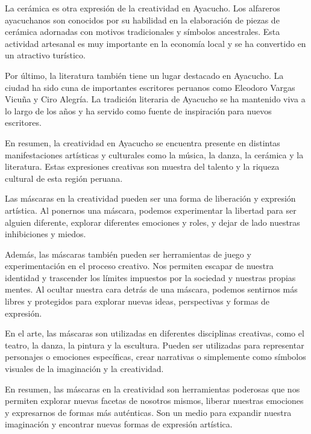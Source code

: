 \documentclass[12pt,a4paper]{article}
\begin{document}
La cerámica es otra expresión de la creatividad en Ayacucho. Los alfareros ayacuchanos son conocidos por su habilidad en la elaboración de piezas de cerámica adornadas con motivos tradicionales y símbolos ancestrales. Esta actividad artesanal es muy importante en la economía local y se ha convertido en un atractivo turístico.

Por último, la literatura también tiene un lugar destacado en Ayacucho. La ciudad ha sido cuna de importantes escritores peruanos como Eleodoro Vargas Vicuña y Ciro Alegría. La tradición literaria de Ayacucho se ha mantenido viva a lo largo de los años y ha servido como fuente de inspiración para nuevos escritores.

En resumen, la creatividad en Ayacucho se encuentra presente en distintas manifestaciones artísticas y culturales como la música, la danza, la cerámica y la literatura. Estas expresiones creativas son muestra del talento y la riqueza cultural de esta región peruana.

Las máscaras en la creatividad pueden ser una forma de liberación y expresión artística. Al ponernos una máscara, podemos experimentar la libertad para ser alguien diferente, explorar diferentes emociones y roles, y dejar de lado nuestras inhibiciones y miedos.

Además, las máscaras también pueden ser herramientas de juego y experimentación en el proceso creativo. Nos permiten escapar de nuestra identidad y trascender los límites impuestos por la sociedad y nuestras propias mentes. Al ocultar nuestra cara detrás de una máscara, podemos sentirnos más libres y protegidos para explorar nuevas ideas, perspectivas y formas de expresión.

En el arte, las máscaras son utilizadas en diferentes disciplinas creativas, como el teatro, la danza, la pintura y la escultura. Pueden ser utilizadas para representar personajes o emociones específicas, crear narrativas o simplemente como símbolos visuales de la imaginación y la creatividad.

En resumen, las máscaras en la creatividad son herramientas poderosas que nos permiten explorar nuevas facetas de nosotros mismos, liberar nuestras emociones y expresarnos de formas más auténticas. Son un medio para expandir nuestra imaginación y encontrar nuevas formas de expresión artística.

\end{document}
